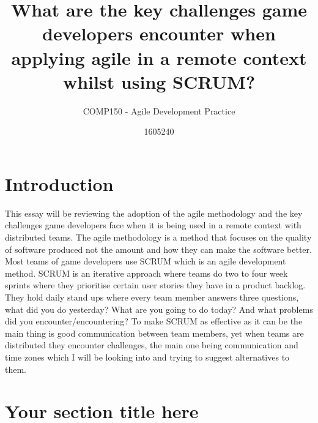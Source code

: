 \documentclass{scrartcl}
\title{What are the key challenges game developers encounter when applying agile in a remote context whilst using SCRUM?}
\subtitle{COMP150 - Agile Development Practice}
\author{1605240}
\begin{document}
\maketitle


\section{Introduction}

This essay will be reviewing the adoption of the agile methodology and the key challenges game developers face when it is being used in a remote context with distributed teams. The agile methodology is a method that focuses on the quality of software produced not the amount and how they can make the software better. Most teams of game developers use SCRUM which is an agile development method. SCRUM is an iterative approach where teams do two to four week sprints where they prioritise certain user stories they have in a product backlog. They hold daily stand ups where every team member answers three questions, what did you do yesterday? What are you going to do today? And what problems did you encounter/encountering? To make SCRUM as effective as it can be the main thing is good communication between team members, yet when teams are distributed they encounter challenges, the main one being communication and time zones which I will be looking into and trying to suggest alternatives to them.

\section{Your section title here}
\end{document}
